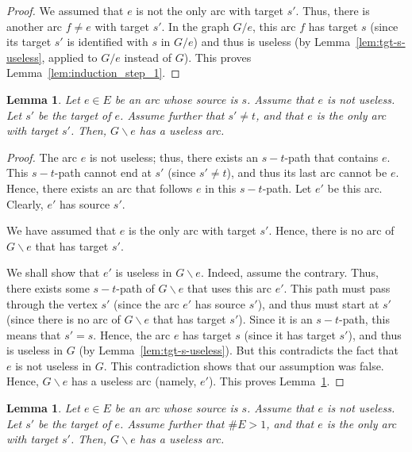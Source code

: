 \documentclass[12pt]{amsart}
\newtheorem{lemma}[theorem]{Lemma}
\theoremstyle{definition}
\begin{document}
\begin{proof}
We assumed that $e$ is not the only arc with target $s'$.
Thus, there is another arc $f \neq e$ with target $s'$.
In the graph $G / e$, this arc $f$ has target $s$ (since its target $s'$ is identified with $s$ in $G / e$) and thus is useless (by Lemma~\ref{lem:tgt-s-useless}, applied to $G / e$ instead of $G$).
This proves Lemma~\ref{lem:induction_step_1}.
\end{proof}

\begin{lemma}\label{lem:induction_step_2a}
	Let $e \in E$ be an arc whose source is $s$.
    Assume that $e$ is not useless.
    Let $s'$ be the target of $e$.
	Assume further that $s' \neq t$, and that $e$ is the only arc with target $s'$.
    Then, $G \backslash e$ has a useless arc.
\end{lemma}

\begin{proof}
The arc $e$ is not useless; thus, there exists an $s-t$-path that contains $e$.
This $s-t$-path cannot end at $s'$ (since $s' \neq t$), and thus its last arc cannot be $e$.
Hence, there exists an arc that follows $e$ in this $s-t$-path.
Let $e'$ be this arc. Clearly, $e'$ has source $s'$.


We have assumed that $e$ is the only arc with target $s'$.
Hence, there is no arc of $G \backslash e$ that has target $s'$.

We shall show that $e'$ is useless in $G \backslash e$.
Indeed, assume the contrary. Thus, there exists some $s-t$-path of $G \backslash e$ that uses this arc $e'$.
This path must pass through the vertex $s'$ (since the arc $e'$ has source $s'$),
and thus must start at $s'$
(since there is no arc of $G \backslash e$ that has target $s'$).
Since it is an $s-t$-path, this means that $s' = s$.
Hence, the arc $e$ has target $s$ (since it has target $s'$),
and thus is useless in $G$ (by Lemma~\ref{lem:tgt-s-useless}).
But this contradicts the fact that $e$ is not useless in $G$.
This contradiction shows that our assumption was false.
Hence, $G \backslash e$ has a useless arc (namely, $e'$).
This proves Lemma~\ref{lem:induction_step_2a}.
\end{proof}

\begin{lemma}\label{lem:induction_step_2b}
	Let $e \in E$ be an arc whose source is $s$.
    Assume that $e$ is not useless.
    Let $s'$ be the target of $e$.
	Assume further that $\# E > 1$, and that $e$ is the only arc with target $s'$.
    Then, $G \backslash e$ has a useless arc.
\end{lemma}
\end{document}
